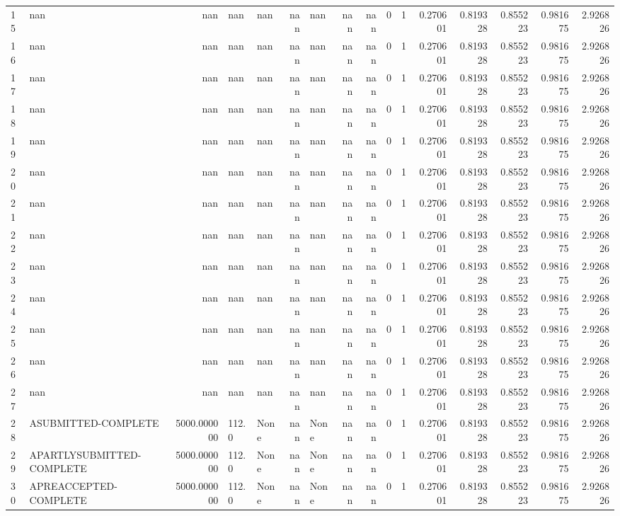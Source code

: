 \begin{tabular}{llrllrlrrrrrrrrr}
15 & nan & nan & nan & nan & nan & nan & nan & nan & 0 & 1 & 0.270601 & 0.819328 & 0.855223 & 0.981675 & 2.926826 \\
16 & nan & nan & nan & nan & nan & nan & nan & nan & 0 & 1 & 0.270601 & 0.819328 & 0.855223 & 0.981675 & 2.926826 \\
17 & nan & nan & nan & nan & nan & nan & nan & nan & 0 & 1 & 0.270601 & 0.819328 & 0.855223 & 0.981675 & 2.926826 \\
18 & nan & nan & nan & nan & nan & nan & nan & nan & 0 & 1 & 0.270601 & 0.819328 & 0.855223 & 0.981675 & 2.926826 \\
19 & nan & nan & nan & nan & nan & nan & nan & nan & 0 & 1 & 0.270601 & 0.819328 & 0.855223 & 0.981675 & 2.926826 \\
20 & nan & nan & nan & nan & nan & nan & nan & nan & 0 & 1 & 0.270601 & 0.819328 & 0.855223 & 0.981675 & 2.926826 \\
21 & nan & nan & nan & nan & nan & nan & nan & nan & 0 & 1 & 0.270601 & 0.819328 & 0.855223 & 0.981675 & 2.926826 \\
22 & nan & nan & nan & nan & nan & nan & nan & nan & 0 & 1 & 0.270601 & 0.819328 & 0.855223 & 0.981675 & 2.926826 \\
23 & nan & nan & nan & nan & nan & nan & nan & nan & 0 & 1 & 0.270601 & 0.819328 & 0.855223 & 0.981675 & 2.926826 \\
24 & nan & nan & nan & nan & nan & nan & nan & nan & 0 & 1 & 0.270601 & 0.819328 & 0.855223 & 0.981675 & 2.926826 \\
25 & nan & nan & nan & nan & nan & nan & nan & nan & 0 & 1 & 0.270601 & 0.819328 & 0.855223 & 0.981675 & 2.926826 \\
26 & nan & nan & nan & nan & nan & nan & nan & nan & 0 & 1 & 0.270601 & 0.819328 & 0.855223 & 0.981675 & 2.926826 \\
27 & nan & nan & nan & nan & nan & nan & nan & nan & 0 & 1 & 0.270601 & 0.819328 & 0.855223 & 0.981675 & 2.926826 \\
28 & A\-SUBMITTED-COMPLETE & 5000.000000 & 112.0 & None & nan & None & nan & nan & 0 & 1 & 0.270601 & 0.819328 & 0.855223 & 0.981675 & 2.926826 \\
29 & A\-PARTLYSUBMITTED-COMPLETE & 5000.000000 & 112.0 & None & nan & None & nan & nan & 0 & 1 & 0.270601 & 0.819328 & 0.855223 & 0.981675 & 2.926826 \\
30 & A\-PREACCEPTED-COMPLETE & 5000.000000 & 112.0 & None & nan & None & nan & nan & 0 & 1 & 0.270601 & 0.819328 & 0.855223 & 0.981675 & 2.926826 \\

\end{tabular}
